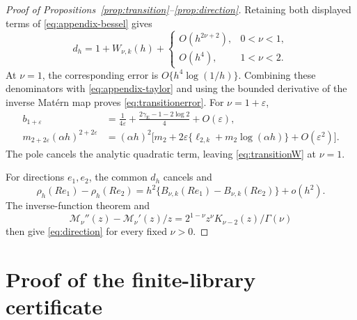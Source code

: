 \documentclass[sigconf]{acmart}
\theoremstyle{remark}
\newcommand{\Matern}{\mathcal M}
\begin{document}
\begin{proof}[Proof of Propositions~\ref{prop:transition}--\ref{prop:direction}]
Retaining both displayed terms of \eqref{eq:appendix-bessel} gives
\[
 d_h=1+W_{\nu,k}(h)+
 \begin{cases}
 O(h^{2\nu+2}),&0<\nu<1,\\
 O(h^4),&1<\nu<2.
 \end{cases}
\]
At \(\nu=1\), the corresponding error is
\(O\{h^4\log(1/h)\}\).  Combining these denominators with
\eqref{eq:appendix-taylor} and using the bounded derivative of the inverse
Matérn map proves \eqref{eq:transitionerror}.  For
\(\nu=1+\varepsilon\),
\begin{align}
 b_{1+\varepsilon}
 &=\frac1{4\varepsilon}
   +\frac{2\gamma_{\mathrm E}-1-2\log2}{4}+O(\varepsilon),\\
 m_{2+2\varepsilon}(\alpha h)^{2+2\varepsilon}
 &=(\alpha h)^2\Big[m_2+2\varepsilon
 \{\ell_{2,k}+m_2\log(\alpha h)\}+O(\varepsilon^2)\Big].
\end{align}
The pole cancels the analytic quadratic term, leaving
\eqref{eq:transitionW} at \(\nu=1\).

For directions \(e_1,e_2\), the common \(d_h\) cancels and
\[
 \rho_h(Re_1)-\rho_h(Re_2)
 =h^2\{B_{\nu,k}(Re_1)-B_{\nu,k}(Re_2)\}+o(h^2).
\]
The inverse-function theorem and
\[
\Matern_\nu''(z)-\Matern_\nu'(z)/z
=2^{1-\nu}z^\nu K_{\nu-2}(z)/\Gamma(\nu)
\]
then give \eqref{eq:direction} for every fixed \(\nu>0\).
\end{proof}

\section{Proof of the finite-library certificate}
\label{app:certificate-proof}
\end{document}
